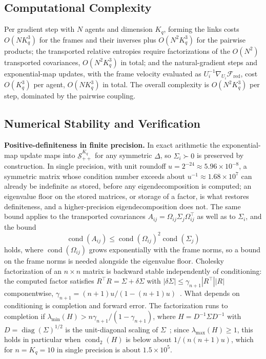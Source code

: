 \subsection*{Computational Complexity}

Per gradient step with $N$ agents and dimension $K_q$, forming the links costs $O(N K_q^3)$ for the frames and their inverses plus $O(N^2 K_q^3)$ for the pairwise products; the transported relative entropies require factorizations of the $O(N^2)$ transported covariances, $O(N^2 K_q^3)$ in total; and the natural-gradient steps and exponential-map updates, with the frame velocity evaluated as $U_i^{-1}\nabla_{U_i}\mathcal{F}_{\mathrm{red}}$, cost $O(K_q^3)$ per agent, $O(N K_q^3)$ in total. The overall complexity is $O(N^2 K_q^3)$ per step, dominated by the pairwise coupling.

\subsection*{Numerical Stability and Verification}

\textbf{Positive-definiteness in finite precision.} In exact arithmetic the exponential-map update maps into $\mathcal{S}_{++}^{K_q}$ for any symmetric $\Delta$, so $\Sigma_i \succ 0$ is preserved by construction. In single precision, with unit roundoff $u = 2^{-24} \approx 5.96 \times 10^{-8}$, a symmetric matrix whose condition number exceeds about $u^{-1} \approx 1.68 \times 10^{7}$ can already be indefinite as stored, before any eigendecomposition is computed; an eigenvalue floor on the stored matrices, or storage of a factor, is what restores definiteness, and a higher-precision eigendecomposition does not. The same bound applies to the transported covariances $A_{ij} = \Omega_{ij}\Sigma_j\Omega_{ij}^\top$ as well as to $\Sigma_i$, and the bound
\begin{equation}
\operatorname{cond}(A_{ij}) \le \operatorname{cond}(\Omega_{ij})^2\operatorname{cond}(\Sigma_j)
\end{equation}
holds, where $\operatorname{cond}(\Omega_{ij})$ grows exponentially with the frame norms, so a bound on the frame norms is needed alongside the eigenvalue floor. Cholesky factorization of an $n \times n$ matrix is backward stable independently of conditioning: the computed factor satisfies $R^\top R = \Sigma + \delta\Sigma$ with $|\delta\Sigma| \le \gamma_{n+1}|R^\top||R|$ componentwise, $\gamma_{n+1} = (n+1)u/(1 - (n+1)u)$~\cite[Thm.~10.3]{Higham2002}. What depends on conditioning is completion and forward error. The factorization runs to completion if $\lambda_{\min}(H) > n\gamma_{n+1}/(1 - \gamma_{n+1})$, where $H = D^{-1}\Sigma D^{-1}$ with $D = \operatorname{diag}(\Sigma)^{1/2}$ is the unit-diagonal scaling of $\Sigma$~\cite[Thm.~10.7]{Higham2002}; since $\lambda_{\max}(H) \ge 1$, this holds in particular when $\operatorname{cond}_2(H)$ is below about $1/(n(n+1)u)$, which for $n = K_q = 10$ in single precision is about $1.5 \times 10^5$.

